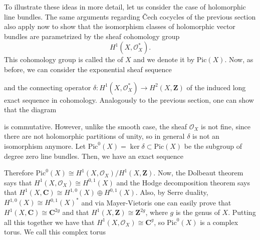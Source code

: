 \documentclass[12pt,a4paper]{book}
\theoremstyle{definition} \newtheorem{defn}[thm]{Definition}
\theoremstyle{definition} \newtheorem{ejemplo}[thm]{Example}
\theoremstyle{remark} \newtheorem{rem}[thm]{Remark}
\def\OO{\mathscr{O}}
\def\CC{\mathbf{C}}
\def\ZZ{\mathbf{Z}}
\def\Pic{\mathrm{Pic}}
\let\emph\relax
\begin{document}
       To illustrate these ideas in more detail, let us consider the case of holomorphic line bundles. The same arguments regarding \v{C}ech cocycles of the previous section also apply now to show that the isomorphism classes of holomorphic vector bundles are parametrized by the sheaf cohomology group
       \begin{equation*}
	 H^1(X,\OO_X^*).
       \end{equation*}
       This cohomology group is called the \emph{Picard group} of $X$ and we denote it by $\Pic(X)$.
       Now, as before, we can consider the exponential sheaf sequence
      \begin{center}
       \end{center}
       and the connecting operator $\delta:H^1(X,\OO_X^*)\rightarrow H^2(X,\ZZ)$ of the induced long exact sequence in cohomology. Analogously to the previous section, one can show that the diagram 
      \begin{center}
       \end{center}
       is commutative. However, unlike the smooth case, the sheaf $\OO_X$ is not fine, since there are not holomorphic partitions of unity, so in general $\delta$ is not an isomorphism anymore. Let $\Pic^0(X)=\ker \delta \subset \Pic(X)$ be the subgroup of degree zero line bundles. Then, we have an exact sequence
      \begin{center}
       \end{center}
       Therefore $\Pic^0(X)\cong H^1(X,\OO_X)/H^1(X,\ZZ)$. Now, the Dolbeaut theorem says that $H^1(X,\OO_X)\cong H^{0,1}(X)$ and the Hodge decomposition theorem says that $H^1(X,\CC)\cong H^{1,0}(X) \oplus H^{0,1}(X)$. Also, by Serre duality, $H^{1,0}(X)\cong H^{0,1}(X)^*$ and via Mayer-Vietoris one can easily prove that $H^1(X,\CC)\cong\CC^{2g}$ and that $H^1(X,\ZZ)\cong\ZZ^{2g}$, where $g$ is the genus of $X$. Putting all this together we have that $H^1(X,\OO_X)\cong \CC^{g}$, so $\Pic^0(X)$ is a complex torus. We call this complex torus 
\end{document}
